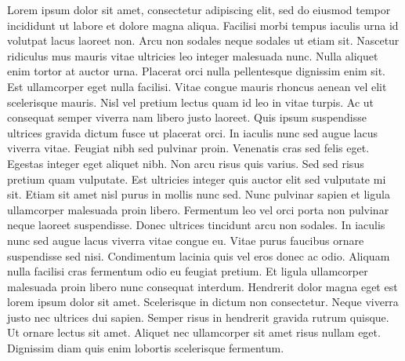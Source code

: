 Lorem ipsum dolor sit amet, consectetur adipiscing elit, sed do eiusmod tempor incididunt ut labore et dolore magna aliqua. Facilisi morbi tempus iaculis urna id volutpat lacus laoreet non. Arcu non sodales neque sodales ut etiam sit. Nascetur ridiculus mus mauris vitae ultricies leo integer malesuada nunc. Nulla aliquet enim tortor at auctor urna. Placerat orci nulla pellentesque dignissim enim sit. Est ullamcorper eget nulla facilisi. Vitae congue mauris rhoncus aenean vel elit scelerisque mauris. Nisl vel pretium lectus quam id leo in vitae turpis. Ac ut consequat semper viverra nam libero justo laoreet. Quis ipsum suspendisse ultrices gravida dictum fusce ut placerat orci. In iaculis nunc sed augue lacus viverra vitae. Feugiat nibh sed pulvinar proin. Venenatis cras sed felis eget. Egestas integer eget aliquet nibh. Non arcu risus quis varius. Sed sed risus pretium quam vulputate.
Est ultricies integer quis auctor elit sed vulputate mi sit. Etiam sit amet nisl purus in mollis nunc sed. Nunc pulvinar sapien et ligula ullamcorper malesuada proin libero. Fermentum leo vel orci porta non pulvinar neque laoreet suspendisse. Donec ultrices tincidunt arcu non sodales. In iaculis nunc sed augue lacus viverra vitae congue eu. Vitae purus faucibus ornare suspendisse sed nisi. Condimentum lacinia quis vel eros donec ac odio. Aliquam nulla facilisi cras fermentum odio eu feugiat pretium. Et ligula ullamcorper malesuada proin libero nunc consequat interdum. Hendrerit dolor magna eget est lorem ipsum dolor sit amet. Scelerisque in dictum non consectetur. Neque viverra justo nec ultrices dui sapien. Semper risus in hendrerit gravida rutrum quisque. Ut ornare lectus sit amet. Aliquet nec ullamcorper sit amet risus nullam eget. Dignissim diam quis enim lobortis scelerisque fermentum.


